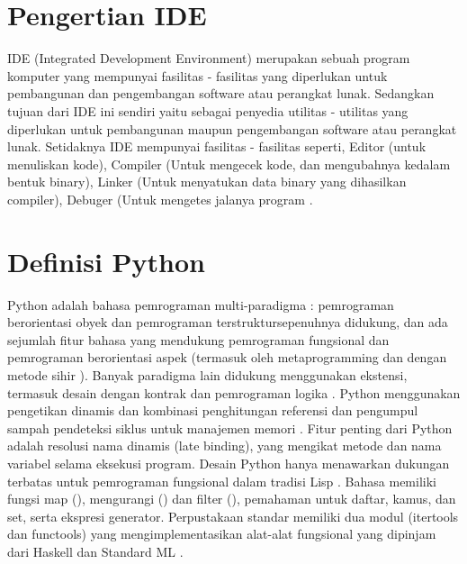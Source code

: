 


\section {Pengertian IDE}
IDE (Integrated Development Environment) merupakan sebuah program komputer yang mempunyai fasilitas - fasilitas yang 
diperlukan untuk pembangunan dan pengembangan software atau perangkat lunak. Sedangkan tujuan dari IDE ini sendiri 
yaitu sebagai penyedia utilitas - utilitas yang diperlukan untuk pembangunan maupun pengembangan software atau perangkat lunak.
Setidaknya IDE mempunyai fasilitas - fasilitas seperti, Editor (untuk menuliskan kode), Compiler (Untuk mengecek kode, 
dan mengubahnya kedalam bentuk binary), Linker (Untuk menyatukan data binary yang dihasilkan compiler), Debuger (Untuk mengetes jalanya program \cite{aripurnamayana2012rancangan}.

\section{Definisi Python}
Python adalah bahasa pemrograman multi-paradigma : pemrograman berorientasi obyek dan pemrograman terstruktursepenuhnya didukung, dan ada sejumlah fitur bahasa yang mendukung pemrograman fungsional dan pemrograman berorientasi aspek (termasuk oleh metaprogramming dan dengan metode sihir ).  Banyak paradigma lain didukung menggunakan ekstensi, termasuk desain dengan kontrak  dan pemrograman logika .
Python menggunakan pengetikan dinamis dan kombinasi penghitungan referensi dan pengumpul sampah pendeteksi siklus untuk manajemen memori . Fitur penting dari Python adalah resolusi nama dinamis (late binding), yang mengikat metode dan nama variabel selama eksekusi program.
Desain Python hanya menawarkan dukungan terbatas untuk pemrograman fungsional dalam tradisi Lisp . Bahasa memiliki fungsi map (), mengurangi () dan filter (), pemahaman untuk daftar, kamus, dan set, serta ekspresi generator. Perpustakaan standar memiliki dua modul (itertools dan functools) yang mengimplementasikan alat-alat fungsional yang dipinjam dari Haskell dan Standard ML \cite{van2007python}.

